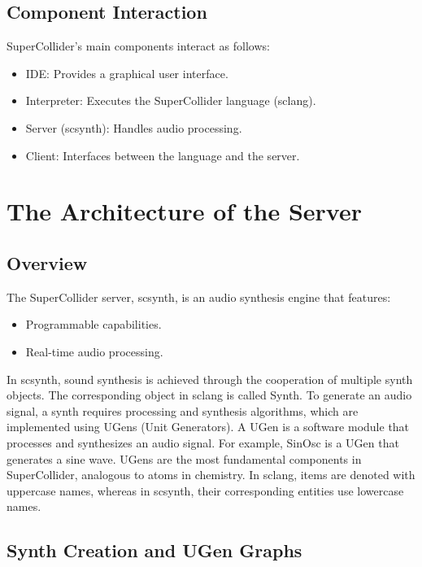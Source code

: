 \subsection{Component Interaction}

SuperCollider's main components interact as follows:

\begin{itemize}
    \item IDE: Provides a graphical user interface.
    \item Interpreter: Executes the SuperCollider language (sclang).
    \item Server (scsynth): Handles audio processing.
    \item Client: Interfaces between the language and the server.
\end{itemize}

\section{The Architecture of the Server}

\subsection{Overview}

The SuperCollider server, scsynth, is an audio synthesis engine that features:

\begin{itemize}
    \item Programmable capabilities.
    \item Real-time audio processing.
\end{itemize}

In scsynth, sound synthesis is achieved through the cooperation of multiple synth objects. The corresponding object in sclang is called Synth. To generate an audio signal, a synth requires processing and synthesis algorithms, which are implemented using UGens (Unit Generators). A UGen is a software module that processes and synthesizes an audio signal. For example, SinOsc is a UGen that generates a sine wave. UGens are the most fundamental components in SuperCollider, analogous to atoms in chemistry. In sclang, items are denoted with uppercase names, whereas in scsynth, their corresponding entities use lowercase names.

\subsection{Synth Creation and UGen Graphs}


